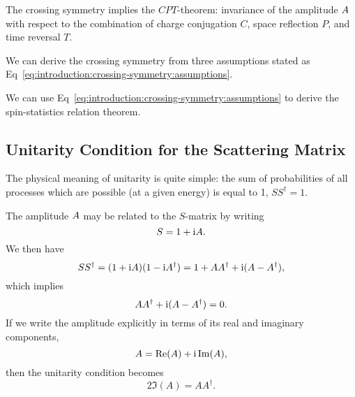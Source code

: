 The crossing symmetry implies the $CPT$-theorem: invariance of the
amplitude $A$ with respect to the combination of charge
conjugation $C$, space reflection $P$, and time reversal $T$.

We can derive the crossing symmetry from three assumptions stated as Eq~\eqref{eq:introduction:crossing-symmetry:assumptions}.

We can use Eq~\eqref{eq:introduction:crossing-symmetry:assumptions}
to derive the spin-statistics relation theorem.

\subsection{Unitarity Condition for the Scattering Matrix}

 The physical
meaning of unitarity is quite simple: the sum of probabilities of all
processes which are possible (at a given energy) is equal to 1,
$SS^{\dagger}=1$.

The amplitude $A$ may be related to the $S$-matrix by writing
\begin{equation}
S = 1 + \mathrm{i} A.
\end{equation}
We then have
\begin{equation}
SS^{\dagger} = (1 + \mathrm{i} A)(1 - \mathrm{i} A^{\dagger}) = 1 + AA^{\dagger} + \mathrm{i}(A-A^{\dagger}),
\end{equation}
which implies
\begin{equation}
AA^{\dagger} + \mathrm{i}(A-A^{\dagger})=0.
\end{equation}
If we write the amplitude explicitly in terms of its real and imaginary components,
\begin{equation}
A = \operatorname{Re}(A) + \mathrm{i}\operatorname{Im}(A),
\end{equation}
then the unitarity condition becomes
\begin{equation}\label{eq:unitarity:in-terms-of-amplitude}
2\Im(A) = AA^{\dagger}.
\end{equation}


